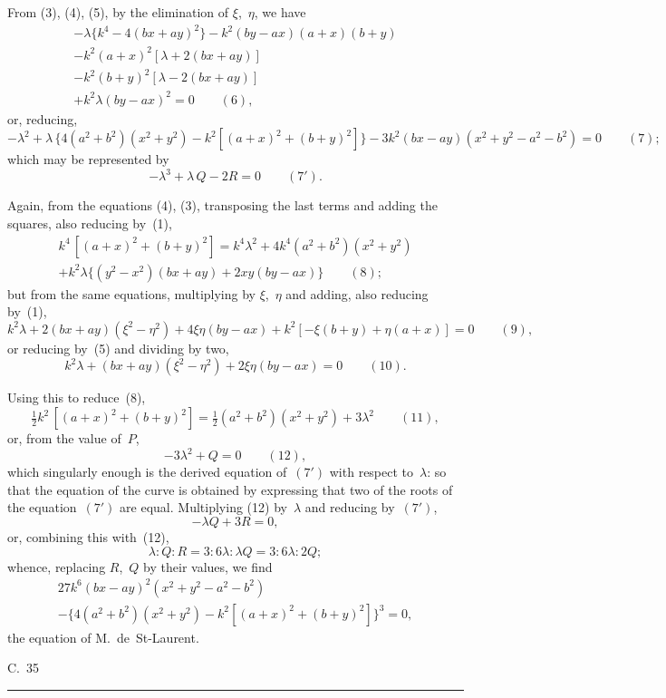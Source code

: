 \documentclass[11pt,a4paper]{book}
\begin{document}
From (3), (4), (5), by the elimination of $\xi$,~$\eta$, we have
\begin{multline*}
-\lambda\{k^4 - 4(bx+ay)^2\} - k^2(by-ax)(a+x)(b+y) \\
- k^2(a+x)^2[\lambda + 2(bx+ay)] \\
- k^2(b+y)^2[\lambda - 2(bx+ay)] \\
+ k^2\lambda(by-ax)^2 = 0 \qquad(6),
\end{multline*}
or, reducing,
\[
-\lambda^2 + \lambda\,\{4(a^2+b^2)(x^2+y^2) - k^2[(a+x)^2 + (b+y)^2]\} - 3k^2(bx-ay)(x^2+y^2-a^2-b^2) = 0 \qquad(7);
\]
which may be represented by
\[
-\lambda^3 + \lambda\,Q - 2R = 0 \qquad(7').
\]

Again, from the equations (4), (3), transposing the last terms and adding the squares, also reducing by~(1),
\begin{multline*}
k^4\,[(a+x)^2 + (b+y)^2] = k^4\lambda^2 + 4k^4(a^2+b^2)(x^2+y^2) \\
+ k^2\lambda\{(y^2-x^2)(bx+ay) + 2xy(by-ax)\} \qquad(8);
\end{multline*}
but from the same equations, multiplying by $\xi$,~$\eta$ and adding, also reducing by~(1),
\[
k^2\lambda + 2(bx+ay)(\xi^2-\eta^2) + 4\xi\eta(by-ax) + k^2[-\xi(b+y) + \eta(a+x)] = 0 \qquad(9),
\]
or reducing by~(5) and dividing by two,
\[
k^2\lambda + (bx+ay)(\xi^2-\eta^2) + 2\xi\eta(by-ax) = 0 \qquad(10).
\]

\newpage
Using this to reduce~(8),
\[
\tfrac{1}{2}k^2\,[(a+x)^2 + (b+y)^2] = \tfrac{1}{2}(a^2+b^2)(x^2+y^2) + 3\lambda^2 \qquad(11),
\]
or, from the value of~$P$,
\[
-3\lambda^2 + Q = 0 \qquad(12),
\]
which singularly enough is the derived equation of~$(7')$ with respect to~$\lambda$: so that the equation of the curve is obtained by expressing that two of the roots of the equation~$(7')$ are equal. Multiplying (12) by~$\lambda$ and reducing by~$(7')$,
\[
-\lambda Q + 3R = 0,
\]
or, combining this with~(12),
\[
\lambda : Q : R = 3 : 6\lambda : \lambda Q = 3 : 6\lambda : 2Q;
\]
whence, replacing $R$,~$Q$ by their values, we find
\begin{multline*}
27k^6(bx-ay)^2(x^2+y^2-a^2-b^2) \\
- \{4(a^2+b^2)(x^2+y^2) - k^2[(a+x)^2+(b+y)^2]\}^3 = 0,
\end{multline*}
the equation of M.~de~St-Laurent.

\begin{center}
C.~35
\end{center}

\vspace{20pt}
\begin{center}
\rule{0.5\textwidth}{0.4pt}
\end{center}
\end{document}
